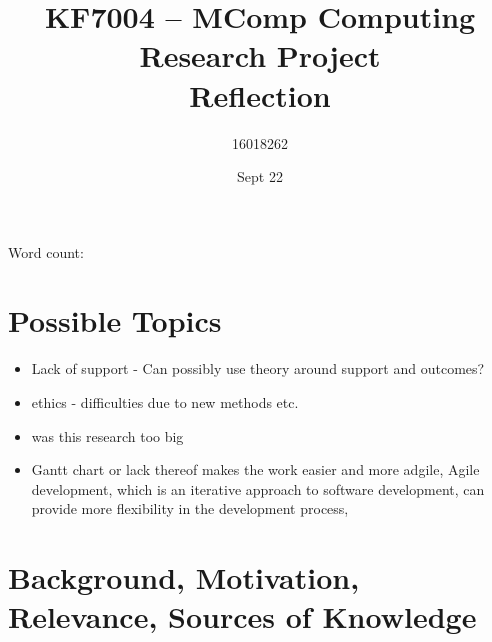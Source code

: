 \documentclass[10pt]{article}
\title{KF7004 – MComp Computing Research Project \\ Reflection}
\author{16018262}
\date{Sept 22}
\begin{document}
\maketitle
\begin{center}
	Word count: 
\end{center}
\tableofcontents
\section{Possible Topics}
\begin{itemize}
	\item Lack of support - Can possibly use theory around support and outcomes?
	\item ethics - difficulties due to new methods etc. 
	\item was this research too big
	\item Gantt chart or lack thereof makes the work easier and more adgile, Agile development, which is an iterative approach to software development, can provide more flexibility in the development process,
\end{itemize}
\section{Background, Motivation, Relevance, Sources of Knowledge}

\printbibliography
\appendix
\end{document}
